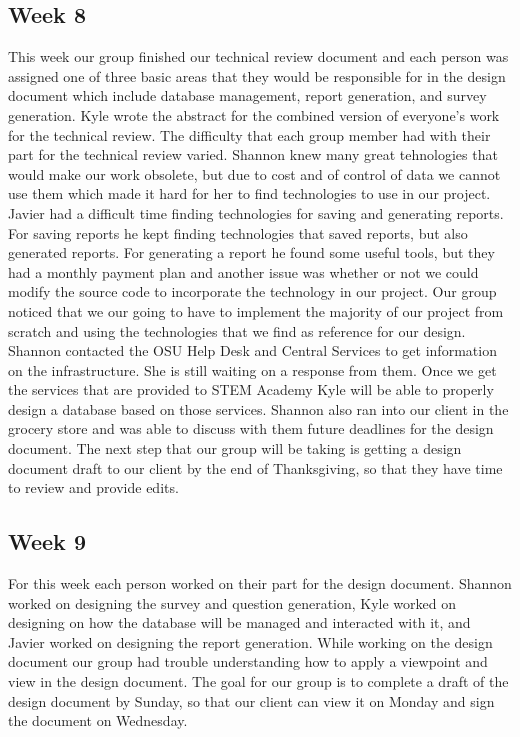 \documentclass[letterpaper,10pt,serif, draftclsnofoot,onecolumn, compsoc, titlepage]{IEEEtran}
\begin{document}
\subsection{Week 8} 

This week our group finished our technical review document and each person was assigned one of three basic areas that they would be responsible for in the design document which include database management, report generation, and survey generation. Kyle wrote the abstract for the combined version of everyone's work for the technical review. The difficulty that each group member had with their part for the technical review varied. Shannon knew many great tehnologies that would make our work obsolete, but due to cost and of control of data we cannot use them which made it hard for her to find technologies to use in our project. Javier had a difficult time finding technologies for saving and generating reports. For saving reports he kept finding technologies that saved reports, but also generated reports. For generating a report he found some useful tools, but they had a monthly payment plan and another issue was whether or not we could modify the source code to incorporate the technology in our project. Our group noticed that we our going to have to implement the majority of our project from scratch and using the technologies that we find as reference for our design. Shannon contacted the OSU Help Desk and Central Services to get information on the infrastructure. She is still waiting on a response from them. Once we get the services that are provided to STEM Academy Kyle will be able to properly design a database based on those services. Shannon also ran into our client in the grocery store and was able to discuss with them future deadlines for the design document.  The next step that our group will be taking is getting a design document draft to our client by the end of Thanksgiving, so that they have time to review and provide edits. 

\subsection{Week 9}
For this week each person worked on their part for the design document. Shannon worked on designing the survey and question generation, Kyle worked on designing on how the database will be managed and interacted with it, and Javier worked on designing the report generation. While working on the design document our group had trouble understanding how to apply a viewpoint and view in the design document. The goal for our group is to complete a draft of the design document by Sunday, so that our client can view it on Monday and sign the document on Wednesday. 
\end{document}
